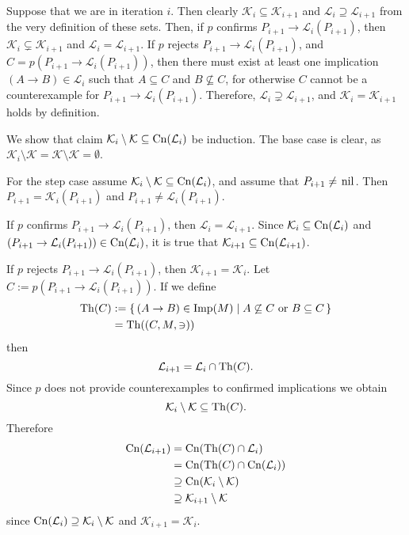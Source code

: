 \begin{Proof}
  Suppose that we are in iteration $i$.  Then clearly $\mathcal{K}_i \subseteq
  \mathcal{K}_{i+1}$ and $\mathcal{L}_i \supseteq \mathcal{L}_{i+1}$ from the very
  definition of these sets.  Then, if $p$ confirms $P_{i+1} \to \mathcal{L}_i(P_{i+1})$,
  then $\mathcal{K}_i \subsetneq \mathcal{K}_{i+1}$ and $\mathcal{L}_i =
  \mathcal{L}_{i+1}$.  If $p$ rejects $P_{i+1} \to \mathcal{L}_i(P_{i+1})$, and $C =
  p(P_{i+1} \to \mathcal{L}_i(P_{i+1}))$, then there must exist at least one implication
  $(A \to B) \in \mathcal{L}_i$ such that $A \subseteq C$ and $B \not\subseteq C$, for
  otherwise $C$ cannot be a counterexample for $P_{i+1} \to \mathcal{L}_i(P_{i+1})$.
  Therefore, $\mathcal{L}_i \supsetneq \mathcal{L}_{i+1}$, and $\mathcal{K}_i =
  \mathcal{K}_{i+1}$ holds by definition.

  We show that claim $\mathcal{K}_i \setminus \mathcal{K} \subseteq \operatorname{Cn}(\mathcal{L}_i)$ be
  induction.  The base case is clear, as $\mathcal{K}_i \setminus \mathcal{K} =
  \mathcal{K} \setminus \mathcal{K} = \emptyset$.

  For the step case assume $\mathcal{K}_i\setminus \mathcal{K} \subseteq
  \operatorname{Cn}(\mathcal{L}_i)$, and assume that $P_{i+1} \neq \text{\lstinline{nil}}$.  Then
  $P_{i+1} = \mathcal{K}_i(P_{i+1})$ and $P_{i+1} \neq \mathcal{L}_i(P_{i+1})$.

  If $p$ confirms $P_{i+1} \to \mathcal{L}_i(P_{i+1})$, then $\mathcal{L}_i =
  \mathcal{L}_{i+1}$.  Since $\mathcal{K}_i \subseteq \operatorname{Cn}(\mathcal{L}_i)$ and $(P_{i+1}
  \to \mathcal{L}_i(P_{i+1})) \in \operatorname{Cn}(\mathcal{L}_i)$, it is true that $\mathcal{K}_{i+1}
  \subseteq \operatorname{Cn}(\mathcal{L}_{i+1})$.

  If $p$ rejects $P_{i+1} \to \mathcal{L}_i(P_{i+1})$, then $\mathcal{K}_{i+1} =
  \mathcal{K}_i$.  Let $C := p(P_{i+1} \to \mathcal{L}_i(P_{i+1}))$.  If we define
  \begin{align*}
    \operatorname{Th}(C)
    &:= {\{\, (A \to B) \in \operatorname{Imp}(M) \mid A \not\subseteq C \text{ or } B \subseteq C \,\}} \\
    &= \operatorname{Th}((C, M, \ni))
  \end{align*}
  then
  \begin{equation*}
    \mathcal{L}_{i+1} = \mathcal{L}_i \cap \operatorname{Th}(C).
  \end{equation*}
  Since $p$ does not provide counterexamples to confirmed implications we obtain
  \begin{equation*}
    \mathcal{K}_i \setminus \mathcal{K} \subseteq \operatorname{Th}(C).
  \end{equation*}
  Therefore
  \begin{align*}
    \operatorname{Cn}(\mathcal{L}_{i+1})
    &= \operatorname{Cn}(\operatorname{Th}(C) \cap \mathcal{L}_i) \\
    &= \operatorname{Cn}(\operatorname{Th}(C) \cap \operatorname{Cn}(\mathcal{L}_i)) \\
    &\supseteq \operatorname{Cn}(\mathcal{K}_i \setminus \mathcal{K}) \\
    &\supseteq \mathcal{K}_{i+1} \setminus \mathcal{K}
  \end{align*}
  since $\operatorname{Cn}(\mathcal{L}_i) \supseteq \mathcal{K}_i \setminus \mathcal{K}$ and
  $\mathcal{K}_{i+1} = \mathcal{K}_i$.
\end{Proof}


